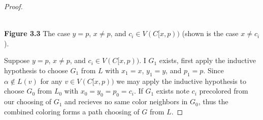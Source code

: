 \documentclass[11pt,letter]{article}
\begin{document}
\begin{proof}
\begin{center}
\hfill\\
\textbf{Figure 3.3} The case $y=p$, $x\ne p$, and $c_i\in V(C[x,p))$ (shown is the case $x\ne c_i$).
\end{center}

\noindent Suppose $y=p$, $x\ne p$, and $c_i\in V(C[x,p))$. I $G_1$ exists, first apply
the inductive hypothesis to choose $G_1$ from $L$ with $x_1=x$, $y_1=y$, and $p_1=p$.
Since $\alpha\not\in L(v)$ for any $v\in V(C[x,p))$ we may apply the inductive hypothesis to choose $G_0$ from
$L_0$ with $x_0=y_0=p_0=c_i$. If $G_1$ exists note $c_i$  precolored from our choosing of $G_1$ and recieves
no same color neighbors in $G_0$, thus the combined coloring forms a path choosing of $G$ from $L$.


\end{proof}
\end{document}
